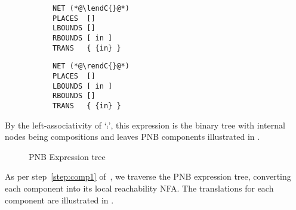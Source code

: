 \begin{figure}[ht]
    \centering
\begin{subfigure}{0.5\textwidth}
    \centering
    \usebox{\lendOneBox}
\end{subfigure}%
\begin{subfigure}{0.5\textwidth}
    \centering
\begin{lstlisting}
NET (*@\lendC{}@*)
PLACES  []
LBOUNDS []
RBOUNDS [ in ]
TRANS   { {in} }
\end{lstlisting}
\end{subfigure}%
    \caption{\lendC{} }
    \label{fig:markedlendC}
\end{figure}

\begin{figure}[ht]
    \centering
\begin{subfigure}{0.5\textwidth}
    \centering
    \usebox{\rendOneBox}
\end{subfigure}%
\begin{subfigure}{0.5\textwidth}
    \centering
\begin{lstlisting}
NET (*@\rendC{}@*)
PLACES  []
LBOUNDS [ in ]
RBOUNDS []
TRANS   { {in} }
\end{lstlisting}
\end{subfigure}%
    \caption{\rendC{} }
    \label{fig:markedrendC}
\end{figure}

By the left-associativity of `$\comp$', this expression is the binary tree with
internal nodes being compositions and leaves PNB components illustrated in
.

\begin{figure}[ht]
    \centering
    \makeThreeCompTree{\usescalebox[0.75]\lendOneBox}
                      {\usescalebox[0.75]\bufferBox}
                      {\usescalebox[0.75]\rendOneBox}
\caption{PNB \bufferSys{-} Expression tree}
\label{fig:BufferExprTree}
\end{figure}

As per step~\ref{step:comp1} of~, we
traverse the PNB expression tree, converting each component into its local
reachability NFA. The translations for each component are illustrated in
.

